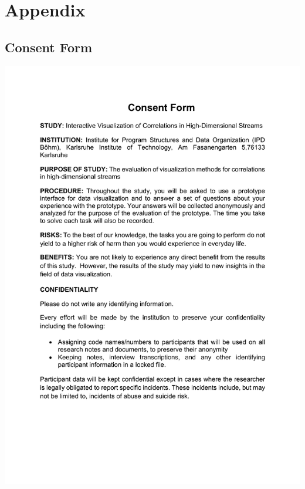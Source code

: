 
\chapter{Appendix}    %
\label{chap:appendix}
\section{Consent Form}
\label{cf}
	\includegraphics[scale=0.8]{us/ConsentForm1.pdf}
